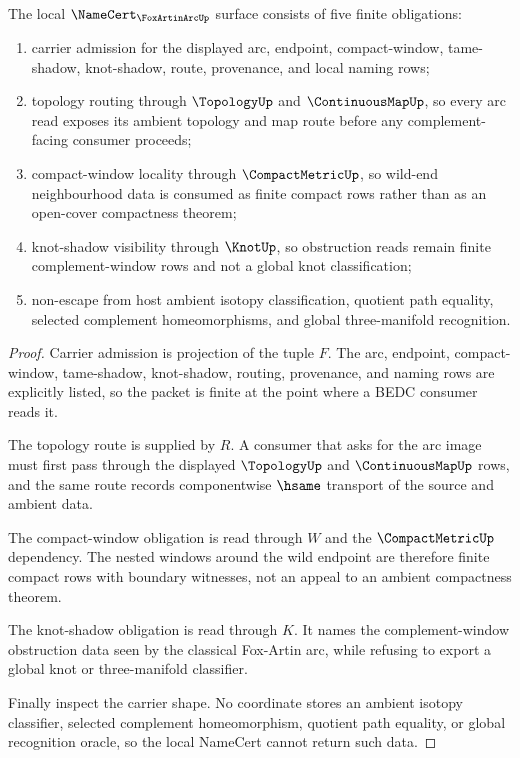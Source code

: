 \begin{theorem}
\label{thm:fox-artin-arc-namecert-obligations}
The local $\NameCert_{\FoxArtinArcUp}$ surface consists of five finite obligations:
\begin{enumerate}
\item carrier admission for the displayed arc, endpoint, compact-window, tame-shadow, knot-shadow, route, provenance, and local naming rows;
\item topology routing through $\TopologyUp$ and $\ContinuousMapUp$, so every arc read exposes its ambient topology and map route before any complement-facing consumer proceeds;
\item compact-window locality through $\CompactMetricUp$, so wild-end neighbourhood data is consumed as finite compact rows rather than as an open-cover compactness theorem;
\item knot-shadow visibility through $\KnotUp$, so obstruction reads remain finite complement-window rows and not a global knot classification;
\item non-escape from host ambient isotopy classification, quotient path equality, selected complement homeomorphisms, and global three-manifold recognition.
\end{enumerate}
\end{theorem}
\begin{proof}
Carrier admission is projection of the tuple $F$. The arc, endpoint, compact-window, tame-shadow, knot-shadow, routing, provenance, and naming rows are explicitly listed, so the packet is finite at the point where a BEDC consumer reads it.

The topology route is supplied by $R$. A consumer that asks for the arc image must first pass through the displayed $\TopologyUp$ and $\ContinuousMapUp$ rows, and the same route records componentwise $\hsame$ transport of the source and ambient data.

The compact-window obligation is read through $W$ and the $\CompactMetricUp$ dependency. The nested windows around the wild endpoint are therefore finite compact rows with boundary witnesses, not an appeal to an ambient compactness theorem.

The knot-shadow obligation is read through $K$. It names the complement-window obstruction data seen by the classical Fox-Artin arc, while refusing to export a global knot or three-manifold classifier.

Finally inspect the carrier shape. No coordinate stores an ambient isotopy classifier, selected complement homeomorphism, quotient path equality, or global recognition oracle, so the local NameCert cannot return such data.
\end{proof}

